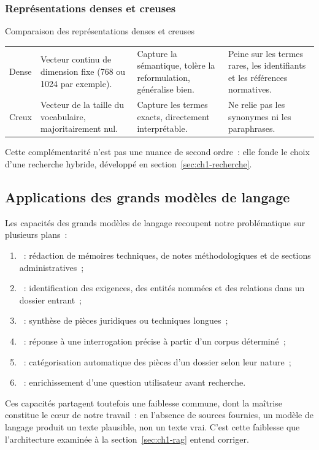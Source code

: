\subsubsection{Représentations denses et creuses}

\begin{btptable}{Comparaison des représentations denses et creuses}
\label{tab:dense-creux}
\begin{tabularx}{\linewidth}{@{}L{1.7cm} L{3.4cm} Y Y@{}}
\toprule
{}
 &  &  &  \\
\midrule
Dense & Vecteur continu de dimension fixe (768 ou 1024 par exemple). & Capture la sémantique, tolère la reformulation, généralise bien. & Peine sur les termes rares, les identifiants et les références normatives. \\
Creux & Vecteur de la taille du vocabulaire, majoritairement nul. & Capture les termes exacts, directement interprétable. & Ne relie pas les synonymes ni les paraphrases. \\
\bottomrule
\end{tabularx}
\end{btptable}

Cette complémentarité n'est pas une nuance de second ordre~: elle fonde le choix
d'une recherche hybride, développé en section~\ref{sec:ch1-recherche}.

\subsection{Applications des grands modèles de langage}

Les capacités des grands modèles de langage recoupent notre problématique sur
plusieurs plans~:

\begin{enumerate}
  \item {}~: rédaction de mémoires techniques, de
        notes méthodologiques et de sections administratives~;
  \item {}~: identification des exigences,
        des entités nommées et des relations dans un dossier entrant~;
  \item {}~: synthèse de pièces juridiques ou techniques longues~;
  \item {}~: réponse à une interrogation
        précise à partir d'un corpus déterminé~;
  \item {}~: catégorisation automatique des pièces d'un
        dossier selon leur nature~;
  \item {}~: enrichissement d'une question
        utilisateur avant recherche.
\end{enumerate}

Ces capacités partagent toutefois une faiblesse commune, dont la maîtrise
constitue le c\oe ur de notre travail~: en l'absence de sources fournies, un
modèle de langage produit un texte plausible, non un texte vrai. C'est cette
faiblesse que l'architecture examinée à la section~\ref{sec:ch1-rag} entend
corriger.
